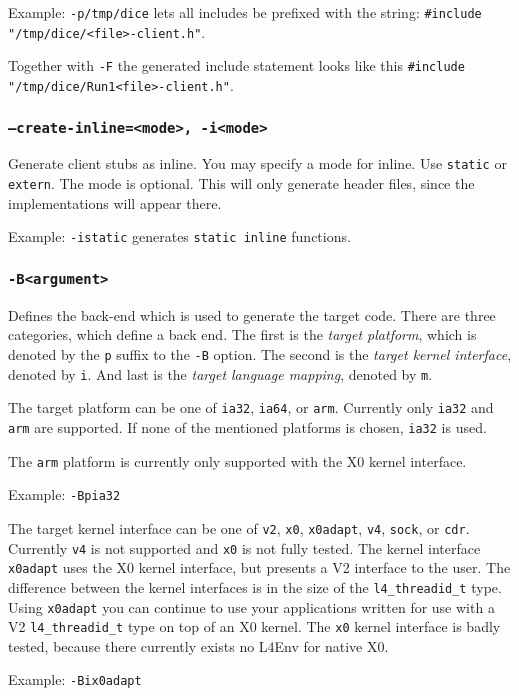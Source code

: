 Example: \verb|-p/tmp/dice| lets all includes be prefixed with
the string: \verb|#include "/tmp/dice/<file>-client.h"|.

Together with \verb|-F| the generated include statement looks like this
\verb|#include "/tmp/dice/Run1<file>-client.h"|.

\subsubsection{{\tt --create-inline=<mode>, -i<mode>}}
Generate client stubs as inline. You may specify a mode for
inline. Use \verb|static| or \verb|extern|. The mode is optional.
This will only generate header files, since the implementations
will appear there.

Example: \verb|-istatic| generates \verb|static inline| functions.

\subsubsection{{\tt -B<argument>}}
Defines the back-end which is used to generate the
target code. There are three categories, which define a 
back end. The first is the {\it target platform}, which is 
denoted by the {\tt p} suffix to the {\tt -B} option.
The second is the {\it target kernel interface}, denoted
by {\tt i}. And last is the {\it target language mapping},
denoted by {\tt m}.

The target platform can be one of {\tt ia32}, {\tt ia64},
or {\tt arm}. Currently only {\tt ia32} and {\tt arm} are supported.
If none of the mentioned
platforms is chosen, {\tt ia32} is used.

The {\tt arm} platform is currently only supported with the X0
kernel interface.

Example: \verb|-Bpia32|

The target kernel interface can be one of {\tt v2},
{\tt x0}, {\tt x0adapt}, {\tt v4}, {\tt sock}, or {\tt cdr}. Currently
{\tt v4} is not supported and {\tt x0} is not fully tested.
The kernel interface {\tt x0adapt} uses the X0 kernel interface,
but presents a V2 interface to the user. The difference between
the kernel interfaces is in the size of the \verb|l4_threadid_t|
type. Using {\tt x0adapt} you can continue to use your
applications written for use with a V2 \verb|l4_threadid_t|
type on top of an X0 kernel.
The {\tt x0} kernel interface is badly tested, because there
currently exists no L4Env for native X0.

Example: \verb|-Bix0adapt|

